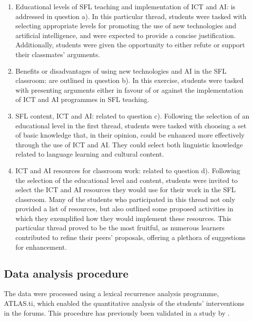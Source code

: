 \documentclass[english]{textolivre}
\begin{document}
\begin{enumerate}[label=\alph*)]
    \item Educational levels of SFL teaching and implementation of ICT and AI:  is addressed in question a). In this particular thread, students were tasked with selecting appropriate levels for promoting the use of new technologies and artificial intelligence, and were expected to provide a concise justification. Additionally, students were given the opportunity to either refute or support their classmates' arguments.
    \item Benefits or disadvantages of using new technologies and AI in the SFL classroom: are outlined in question b). In this exercise, students were tasked with presenting arguments either in favour of or against the implementation of ICT and AI programmes in SFL teaching.
    \item SFL content, ICT and AI: related to question c). Following the selection of an educational level in the first thread, students were tasked with choosing a set of basic knowledge that, in their opinion, could be enhanced more effectively through the use of ICT and AI. They could select both linguistic knowledge related to language learning and cultural content.
    \item ICT and AI resources for classroom work: related to question d). Following the selection of the educational level and content, students were invited to select the ICT and AI resources they would use for their work in the SFL classroom. Many of the students who participated in this thread not only provided a list of resources, but also outlined some proposed activities in which they exemplified how they would implement these resources. This particular thread proved to be the most fruitful, as numerous learners contributed to refine their peers' proposals, offering a plethora of suggestions for enhancement.
\end{enumerate}

\subsection{Data analysis procedure}
The data were processed using a lexical recurrence analysis programme, ATLAS.ti, which enabled the quantitative analysis of the students' interventions in the forums. This procedure has previously been validated in a study by \textcite{fabregat-barrios2024b}.
\end{document}
